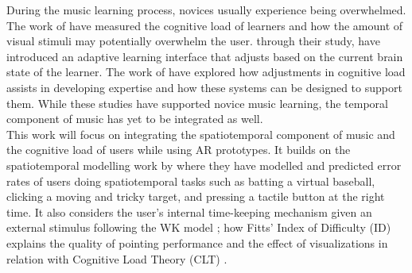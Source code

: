 \documentclass[manuscript,screen]{acmart}
\begin{document}
During the music learning process, novices usually experience being overwhelmed. The work of \citet{klepsch2017development} have measured the cognitive load of learners and how the amount of visual stimuli may potentially overwhelm the user. \citet{yuksel2016learn} through their study, have introduced an adaptive learning interface that adjusts based on the current brain state of the learner. The work of \citet{rikers2004cognitive} have explored how adjustments in cognitive load assists in developing expertise and how these systems can be designed to support them. While these studies have supported novice music learning, the temporal component of music has yet to be integrated as well.\\

This work will focus on integrating the spatiotemporal component of music and the cognitive load of users while using AR prototypes. It builds on the spatiotemporal modelling work by \citet{lee2016modelling, lee2017boxer, kim2018impact, liao2020button} where they have modelled and predicted error rates of users doing spatiotemporal tasks such as batting a virtual baseball, clicking a moving and tricky target, and pressing a tactile button at the right time. It also considers the user's internal time-keeping mechanism given an external stimulus following the WK model \cite{wing1973response, wing1973timing}; how Fitts' Index of Difficulty (ID) explains the quality of pointing performance \cite{mackenzie1992extending, park2020intermittent} and the effect of visualizations in relation with Cognitive Load Theory (CLT) \cite{klepsch2017development}.\\
\end{document}
